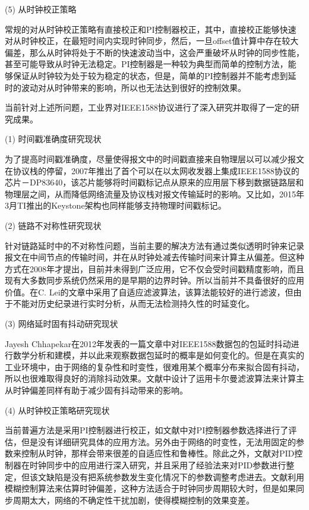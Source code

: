 (5) 从时钟校正策略

常规的对从时钟校正策略有直接校正和PI控制器校正，其中，直接校正能够快速对从时钟校正，在最短时间内实现时钟同步，然后，一旦offset值计算中存在较大偏差，那么从时钟将处于不断的快速波动当中，这会严重破坏从时钟的同步性能，甚至可能导致从时钟无法稳定。PI控制器是一种较为典型而简单的控制方法，能够保证从时钟较为处于较为稳定的状态，但是，简单的PI控制器并不能考虑到延时的波动对从时钟带来的影响，所以也无法达到很好的控制效果。

当前针对上述所问题，工业界对IEEE1588协议\supercite{2}进行了深入研究并取得了一定的研究成果。

(1) 时间戳准确度研究现状

为了提高时间戳准确度，尽量使得报文中的时间戳直接来自物理层以可以减少报文在协议栈的停留，2007年推出了首个可以在以太网收发器上集成IEEE1588协议的芯片－DP83640\supercite{4}，该芯片能够将时间戳标记点从原来的应用层下移到数据链路层和物理层之间，从而降低网络流量及协议栈对报文传输延时的影响。又比如，2015年3月TI推出的Keystone架构也同样能够支持物理时间戳标记\supercite{5}。

(2) 链路不对称性研究现状

针对链路延时中的不对称性问题，当前主要的解决方法有通过类似透明时钟来记录报文在中间节点的传输时间，并在从时钟处减去传输时间来计算主从偏差。但这种方式在2008年才提出，目前并未得到广泛应用，它不仅会受时间戳精度影响，而且现有大多数同步系统仍然采用的是早期的边界时钟。所以当前并不具备很好的应用价值。在C. Lei的文章\parencite{57}中采用了自适应滤波算法，该算法能较好的进行滤波，但由于不能对历史纪录进行实时分析，从而无法检测持久性的时延变化。

(3) 网络延时固有抖动研究现状

Jayesh Chhapekar在2012年发表的一篇文章中对IEEE1588数据包的包延时抖动进行数学分析和建模，并以此来观察数据包延时的概率是如何变化的\supercite{8}。但是在真实的工业环境中，由于网络的复杂性和时变性，很难用某个概率分布来拟合固有抖动，所以也很难取得良好的消除抖动效果。文献\parencite{9}中设计了运用卡尔曼滤波算法来计算主从时钟偏差同样有助于减少固有抖动带来的影响。

(4) 从时钟校正策略研究现状

当前普遍方法是采用PI控制器进行校正，如文献\parencite{10}中对PI控制器参数选择进行了评估，但是没有详细研究具体的应用方法。另外由于网络的时变性，无法用固定的参数来控制从时钟，那样会带来很差的自适应性和鲁棒性。除此之外，文献\parencite{11}对PID控制器在时钟同步中的应用进行深入研究，并且采用了经验法来对PID参数进行整定，但该文缺陷是没有把系统参数发生变化情况下的参数调整考虑进去。文献\parencite{12}利用模糊控制算法来估算时钟偏差，这种方法适合于时钟同步周期较大时，但是如果同步周期太大，网络的不确定性干扰加剧，使得模糊控制的效果变差。

